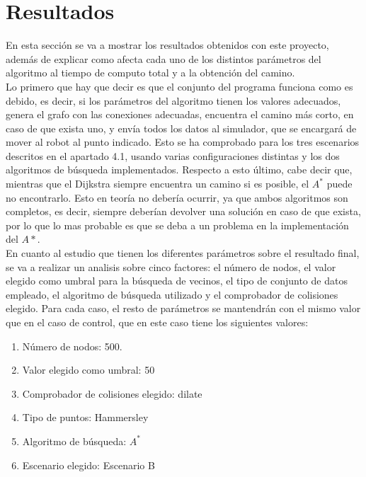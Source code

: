 \section{Resultados}
\label{resultados}

En esta sección se va a mostrar los resultados obtenidos con este proyecto, además de explicar como afecta cada uno de los distintos parámetros del algoritmo al tiempo de computo total y a la obtención del camino.\\

Lo primero que hay que decir es que el conjunto del programa funciona como es debido, es decir, si los parámetros del algoritmo tienen los valores adecuados, genera el grafo con las conexiones adecuadas, encuentra el camino más corto, en caso de que exista uno, y envía todos los datos al simulador, que se encargará de mover al robot al punto indicado. Esto se ha comprobado para los tres escenarios descritos en el apartado 4.1, usando varias configuraciones distintas y los dos algoritmos de búsqueda implementados. Respecto a esto último, cabe decir que, mientras que el Dijkstra siempre encuentra un camino si es posible, el $A^*$ puede no encontrarlo. Esto en teoría no debería ocurrir, ya que ambos algoritmos son completos, es decir, siempre deberían devolver una solución en caso de que exista, por lo que lo mas probable es que se deba a un problema en la implementación del $A*$.\\

En cuanto al estudio que tienen los diferentes parámetros sobre el resultado final, se va a realizar un analisis sobre cinco factores: el número de nodos, el valor elegido como umbral para la búsqueda de vecinos, el tipo de conjunto de datos empleado, el algoritmo de búsqueda utilizado y el comprobador de colisiones elegido. Para cada caso, el resto de parámetros se mantendrán con el mismo valor que en el caso de control, que en este caso tiene los siguientes valores:\\

\begin{enumerate}
\item Número de nodos: 500.
\item Valor elegido como umbral: 50
\item Comprobador de colisiones elegido: dilate
\item Tipo de puntos: Hammersley
\item Algoritmo de búsqueda: $A^*$
\item Escenario elegido: Escenario B
\end{enumerate}

